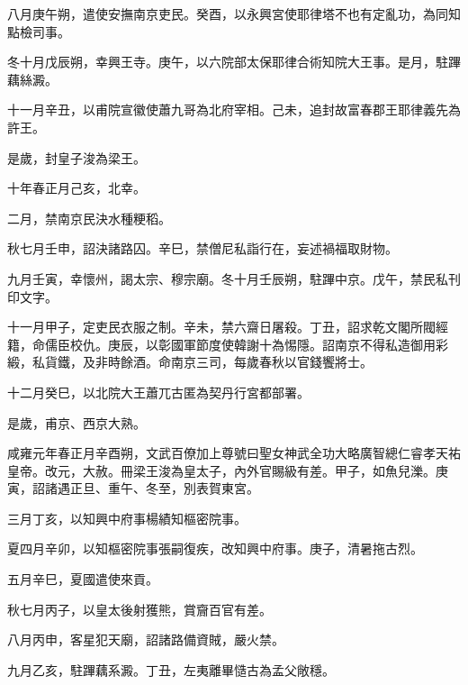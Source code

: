 \begin{pinyinscope}
 八月庚午朔，遣使安撫南京吏民。癸酉，以永興宮使耶律塔不也有定亂功，為同知點檢司事。



 冬十月戊辰朔，幸興王寺。庚午，以六院部太保耶律合術知院大王事。是月，駐蹕藕絲澱。



 十一月辛丑，以甫院宣徽使蕭九哥為北府宰相。己未，追封故富春郡王耶律義先為許王。



 是歲，封皇子浚為梁王。



 十年春正月己亥，北幸。



 二月，禁南京民決水種粳稻。



 秋七月壬申，詔決諸路囚。辛巳，禁僧尼私詣行在，妄述禍福取財物。



 九月壬寅，幸懷州，謁太宗、穆宗廟。冬十月壬辰朔，駐蹕中京。戊午，禁民私刊印文字。



 十一月甲子，定吏民衣服之制。辛未，禁六齋日屠殺。丁丑，詔求乾文閣所閥經籍，命儒臣校仇。庚辰，以彰國軍節度使韓謝十為惕隱。詔南京不得私造御用彩緞，私貨鐵，及非時餘酒。命南京三司，每歲春秋以官錢饗將士。



 十二月癸巳，以北院大王蕭兀古匿為契丹行宮都部署。



 是歲，甫京、西京大熟。



 咸雍元年春正月辛酉朔，文武百僚加上尊號曰聖女神武全功大略廣智總仁睿孝天祐皇帝。改元，大赦。冊梁王浚為皇太子，內外官賜級有差。甲子，如魚兒濼。庚寅，詔諸遇正旦、重午、冬至，別表賀東宮。



 三月丁亥，以知興中府事楊績知樞密院事。



 夏四月辛卯，以知樞密院事張嗣復疾，改知興中府事。庚子，清暑拖古烈。



 五月辛巳，夏國遣使來貢。



 秋七月丙子，以皇太後射獲熊，賞齎百官有差。



 八月丙申，客星犯天廟，詔諸路備資賊，嚴火禁。



 九月乙亥，駐蹕藕系澱。丁丑，左夷離畢慥古為孟父敞穩。




\end{pinyinscope}
